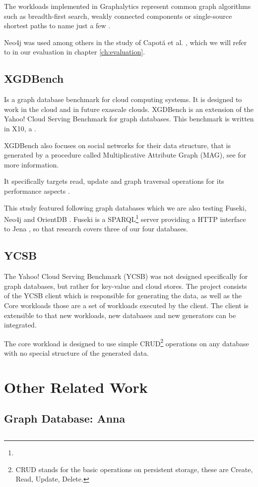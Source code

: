 The workloads implemented in Graphalytics represent common graph algorithms such as breadth-first search, weakly connected components or single-source shortest paths to name just a few \cite[7]{Iosup}.

Neo4j was used among others in the study of Capot\u{a} et al. \cite{Capota2015c}, which we will refer to in our evaluation in chapter \ref{ch:evaluation}.

\subsection{XGDBench}
Is a graph database benchmark for cloud computing systems.
It is designed to work in the cloud and in future exascale clouds.
XGDBench is an extension of the Yahoo! Cloud Serving Benchmark for graph databases.
This benchmark is written in X10,
a .

XGDBench also focuses on social networks for their data structure,
that is generated by a procedure called Multiplicative Attribute Graph (MAG), see \cite{Kim2012} for more information.

It specifically targets read, update and graph traversal operations for its performance aspects \cite[366]{Dayarathna2012}.

This study featured following graph databases which we are also testing Fuseki, Neo4j and OrientDB \cite[364]{Dayarathna2012}.
Fuseki is a SPARQL\footnote{} server providing a HTTP interface to Jena \cite{Apache2016},
so that research covers three of our four databases.

\subsection{YCSB}
\label{ch:background:se:ycsb}
The Yahoo! Cloud Serving Benchmark (YCSB) was not designed specifically for graph databases,
but rather for key-value and cloud stores.
The project consists of the YCSB client which is responsible for generating the data,
as well as the Core workloads those are a set of workloads executed by the client.
The client is extensible to that new workloads,
new databases and new generators can be integrated. \cite{Yahoo!2010}

The core workload is designed to use simple CRUD\footnote{CRUD stands for the basic operations on persistent storage, these are Create, Read, Update, Delete.} operations on any database with no special structure of the generated data.

\section{Other Related Work }

\subsection{Graph Database: Anna}

\subsection{}
